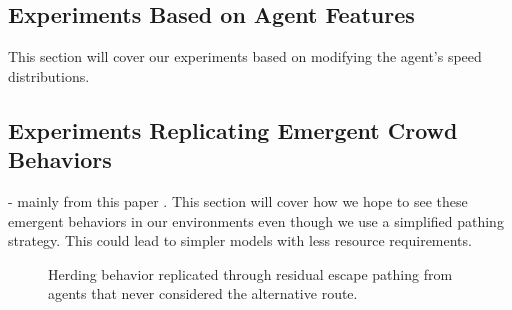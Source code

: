 \documentclass[12pt,letterpaper]{article}
\begin{document}
\subsection{Experiments Based on Agent Features}

This section will cover our experiments based on modifying the agent's speed distributions.


\subsection{Experiments Replicating Emergent Crowd Behaviors} \label{emergentBehavior}
- mainly from this paper \cite{almeidaCrowdSimulationModeling2013}  .  This section will cover how we hope to see these emergent behaviors in our environments even though we use a simplified pathing strategy.  This could lead to simpler models with less resource requirements.



\begin{figure}[!htbp]
  \centering
  \hfill
  \caption{Herding behavior replicated through residual escape pathing from agents that never considered the alternative route.}
\end{figure}
\end{document}
